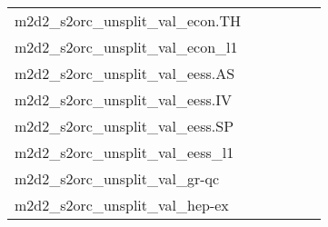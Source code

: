 {\begin{longtable}{m{6cm}m{1.7cm}m{1.7cm}m{1.7cm}m{1.7cm}m{1.7cm}}
	m2d2\_s2orc\_unsplit\_val\_econ.TH  & \colorbox[HTML]{77c578}{\makebox[\mywidth][c]{9.75}} & \colorbox[HTML]{e8f6ae}{\makebox[\mywidth][c]{10.16}} & \colorbox[HTML]{ffffe5}{\makebox[\mywidth][c]{11.99}} & \colorbox[HTML]{ccea9c}{\makebox[\mywidth][c]{9.99}} & \colorbox[HTML]{acdc8d}{\makebox[\mywidth][c]{9.88}}\\
	m2d2\_s2orc\_unsplit\_val\_econ\_l1  & \colorbox[HTML]{77c578}{\makebox[\mywidth][c]{9.75}} & \colorbox[HTML]{e8f6ae}{\makebox[\mywidth][c]{10.16}} & \colorbox[HTML]{ffffe5}{\makebox[\mywidth][c]{11.99}} & \colorbox[HTML]{ccea9c}{\makebox[\mywidth][c]{9.99}} & \colorbox[HTML]{acdc8d}{\makebox[\mywidth][c]{9.88}}\\
	m2d2\_s2orc\_unsplit\_val\_eess.AS  & \colorbox[HTML]{bee496}{\makebox[\mywidth][c]{12.05}} & \colorbox[HTML]{d9f0a3}{\makebox[\mywidth][c]{12.14}} & \colorbox[HTML]{ffffe5}{\makebox[\mywidth][c]{13.88}} & \colorbox[HTML]{ccea9c}{\makebox[\mywidth][c]{12.09}} & \colorbox[HTML]{77c578}{\makebox[\mywidth][c]{11.88}}\\
	m2d2\_s2orc\_unsplit\_val\_eess.IV  & \colorbox[HTML]{ccea9c}{\makebox[\mywidth][c]{13.77}} & \colorbox[HTML]{e3f4aa}{\makebox[\mywidth][c]{13.89}} & \colorbox[HTML]{ffffe5}{\makebox[\mywidth][c]{15.71}} & \colorbox[HTML]{c8e89a}{\makebox[\mywidth][c]{13.76}} & \colorbox[HTML]{77c578}{\makebox[\mywidth][c]{13.54}}\\
	m2d2\_s2orc\_unsplit\_val\_eess.SP  & \colorbox[HTML]{c2e698}{\makebox[\mywidth][c]{11.29}} & \colorbox[HTML]{e6f5ad}{\makebox[\mywidth][c]{11.45}} & \colorbox[HTML]{ffffe5}{\makebox[\mywidth][c]{12.94}} & \colorbox[HTML]{bde395}{\makebox[\mywidth][c]{11.28}} & \colorbox[HTML]{77c578}{\makebox[\mywidth][c]{11.13}}\\
	m2d2\_s2orc\_unsplit\_val\_eess\_l1  & \colorbox[HTML]{ccea9c}{\makebox[\mywidth][c]{13.77}} & \colorbox[HTML]{e3f4aa}{\makebox[\mywidth][c]{13.89}} & \colorbox[HTML]{ffffe5}{\makebox[\mywidth][c]{15.71}} & \colorbox[HTML]{c8e89a}{\makebox[\mywidth][c]{13.76}} & \colorbox[HTML]{77c578}{\makebox[\mywidth][c]{13.54}}\\
	m2d2\_s2orc\_unsplit\_val\_gr-qc  & \colorbox[HTML]{b3df91}{\makebox[\mywidth][c]{12.84}} & \colorbox[HTML]{dcf1a5}{\makebox[\mywidth][c]{12.99}} & \colorbox[HTML]{ffffe5}{\makebox[\mywidth][c]{14.68}} & \colorbox[HTML]{b3df91}{\makebox[\mywidth][c]{12.84}} & \colorbox[HTML]{77c578}{\makebox[\mywidth][c]{12.71}}\\
	m2d2\_s2orc\_unsplit\_val\_hep-ex  & \colorbox[HTML]{fafdca}{\makebox[\mywidth][c]{10.47}} & \colorbox[HTML]{f7fcbc}{\makebox[\mywidth][c]{10.37}} & \colorbox[HTML]{ffffe5}{\makebox[\mywidth][c]{11.61}} & \colorbox[HTML]{cdeb9d}{\makebox[\mywidth][c]{10.13}} & \colorbox[HTML]{77c578}{\makebox[\mywidth][c]{9.96}}\\

\end{longtable}}
